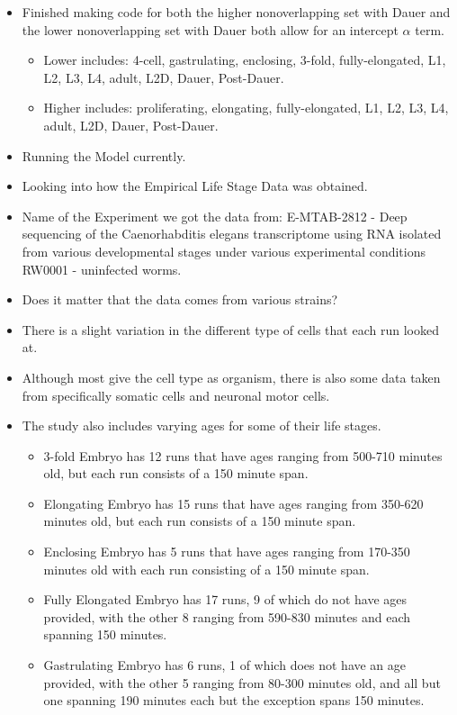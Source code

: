 \documentclass[letterpaper,index=totoc,hyperref,openany]{labbook} %
\begin{document}
\begin{itemize}
\item Finished making code for both the higher nonoverlapping set with Dauer and the lower nonoverlapping set with Dauer both allow for an intercept $ \alpha$ term.
\begin{itemize}
\item Lower includes: 4-cell, gastrulating, enclosing, 3-fold, fully-elongated, L1, L2, L3, L4, adult, L2D, Dauer, Post-Dauer.
\item Higher includes: proliferating, elongating, fully-elongated, L1, L2, L3, L4, adult, L2D, Dauer, Post-Dauer.
\end{itemize}
\item Running the Model currently.
\item Looking into how the Empirical Life Stage Data was obtained.
\item Name of the Experiment we got the data from: E-MTAB-2812 - Deep sequencing of the Caenorhabditis elegans transcriptome using RNA isolated from various developmental stages under various experimental conditions RW0001 - uninfected worms.
\item Does it matter that the data comes from various strains?
\item There is a slight variation in the different type of cells that each run looked at.
\item Although most give the cell type as organism, there is also some data taken from specifically somatic cells and neuronal motor cells.
\item The study also includes varying ages for some of their life stages.
\begin{itemize}
\item 3-fold Embryo has 12 runs that have ages ranging from 500-710 minutes old, but each run consists of a 150 minute span.
\item Elongating Embryo has 15 runs that have ages ranging from 350-620 minutes old, but each run consists of a 150 minute span.
\item Enclosing Embryo has 5 runs that have ages ranging from 170-350 minutes old with each run consisting of a 150 minute span.
\item Fully Elongated Embryo has 17 runs, 9 of which do not have ages provided, with the other 8 ranging from 590-830 minutes and each spanning 150 minutes.
\item Gastrulating Embryo has 6 runs, 1 of which does not have an age provided, with the other 5 ranging from 80-300 minutes old, and all but one spanning 190 minutes each but the exception spans 150 minutes.

\end{itemize}
\end{itemize}
\end{document}
